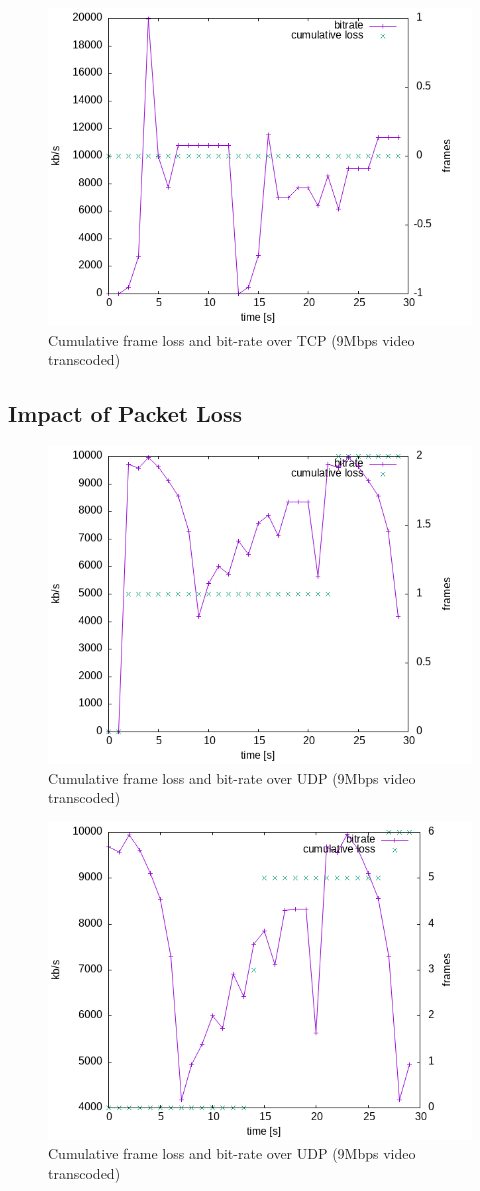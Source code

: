 \documentclass{exam}
\begin{document}
\begin{figure}[H]
    \centering
    \includegraphics[width=0.5\linewidth]{loss_http_9000_frame.png}
    \caption{Cumulative frame loss and bit-rate over TCP (9Mbps video transcoded)}
    \label{fig:loss_http_9000_frame}
\end{figure}

\subsection{Impact of Packet Loss}
\begin{figure}[H]
    \centering
    \includegraphics[width=0.5\linewidth]{transcode_udp_9000_frame.png}
    \caption{Cumulative frame loss and bit-rate over UDP (9Mbps video transcoded)}
    \label{fig:transcode_udp_9000_frame}
\end{figure}


\begin{figure}[H]
    \centering
    \includegraphics[width=0.5\linewidth]{loss_udp_9000_frame.png}
    \caption{Cumulative frame loss and bit-rate over UDP (9Mbps video transcoded)}
    \label{fig:loss_udp_9000_frame}
\end{figure}
\end{document}
